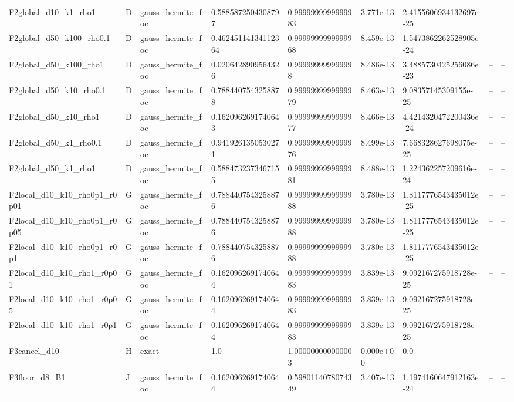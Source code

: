 \begin{tabular}{lllllllll}
F2global\_d10\_k1\_rho1 & D & gauss\_hermite\_foc & 0.5885872504308797 & 0.9999999999999983 & 3.771e-13 & 2.4155606934132697e-25 & -- & -- \\
F2global\_d50\_k100\_rho0.1 & D & gauss\_hermite\_foc & 0.46245114134112364 & 0.9999999999999968 & 8.459e-13 & 1.5473862262528905e-24 & -- & -- \\
F2global\_d50\_k100\_rho1 & D & gauss\_hermite\_foc & 0.0206428909564326 & 0.999999999999998 & 8.486e-13 & 3.4885730425256086e-23 & -- & -- \\
F2global\_d50\_k10\_rho0.1 & D & gauss\_hermite\_foc & 0.7884407543258878 & 0.9999999999999979 & 8.463e-13 & 9.08357145309155e-25 & -- & -- \\
F2global\_d50\_k10\_rho1 & D & gauss\_hermite\_foc & 0.1620962691740643 & 0.9999999999999977 & 8.466e-13 & 4.4214320472200436e-24 & -- & -- \\
F2global\_d50\_k1\_rho0.1 & D & gauss\_hermite\_foc & 0.9419261350530271 & 0.9999999999999976 & 8.499e-13 & 7.668328627698075e-25 & -- & -- \\
F2global\_d50\_k1\_rho1 & D & gauss\_hermite\_foc & 0.5884732373467155 & 0.9999999999999981 & 8.488e-13 & 1.224362257209616e-24 & -- & -- \\
F2local\_d10\_k10\_rho0p1\_r0p01 & G & gauss\_hermite\_foc & 0.7884407543258876 & 0.9999999999999988 & 3.780e-13 & 1.8117776543435012e-25 & -- & -- \\
F2local\_d10\_k10\_rho0p1\_r0p05 & G & gauss\_hermite\_foc & 0.7884407543258876 & 0.9999999999999988 & 3.780e-13 & 1.8117776543435012e-25 & -- & -- \\
F2local\_d10\_k10\_rho0p1\_r0p1 & G & gauss\_hermite\_foc & 0.7884407543258876 & 0.9999999999999988 & 3.780e-13 & 1.8117776543435012e-25 & -- & -- \\
F2local\_d10\_k10\_rho1\_r0p01 & G & gauss\_hermite\_foc & 0.1620962691740644 & 0.9999999999999983 & 3.839e-13 & 9.092167275918728e-25 & -- & -- \\
F2local\_d10\_k10\_rho1\_r0p05 & G & gauss\_hermite\_foc & 0.1620962691740644 & 0.9999999999999983 & 3.839e-13 & 9.092167275918728e-25 & -- & -- \\
F2local\_d10\_k10\_rho1\_r0p1 & G & gauss\_hermite\_foc & 0.1620962691740644 & 0.9999999999999983 & 3.839e-13 & 9.092167275918728e-25 & -- & -- \\
F3cancel\_d10 & H & exact & 1.0 & 1.000000000000003 & 0.000e+00 & 0.0 & -- & -- \\
F3floor\_d8\_B1 & J & gauss\_hermite\_foc & 0.1620962691740644 & 0.5980114078074349 & 3.407e-13 & 1.1974160647912163e-24 & -- & -- \\

\end{tabular}
